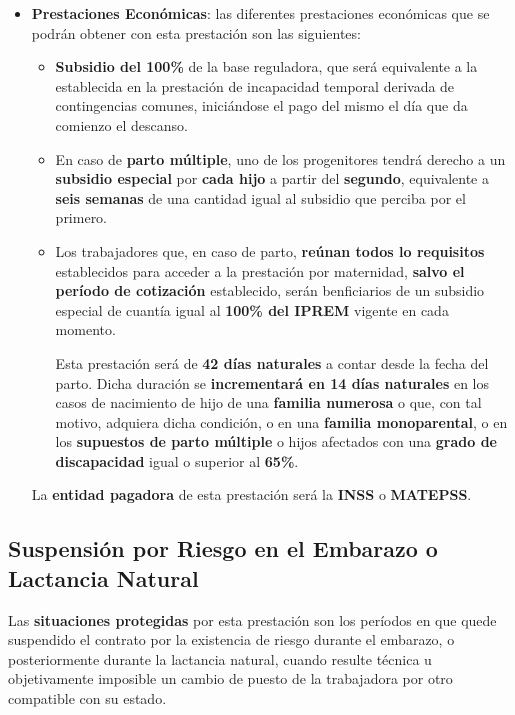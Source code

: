 \begin{itemize}
    \item \textbf{Prestaciones Económicas}: las diferentes prestaciones económicas que se podrán obtener con esta prestación son las siguientes:

    \begin{itemize}
        \item \textbf{Subsidio del 100\%}  de la base reguladora, que será equivalente a la establecida en la prestación de incapacidad temporal derivada de contingencias comunes, iniciándose el pago del mismo el día que da comienzo el descanso.
        \item En caso de \textbf{parto múltiple}, uno de los progenitores tendrá derecho  a un \textbf{subsidio especial} por \textbf{cada hijo} a partir del \textbf{segundo}, equivalente a \textbf{seis semanas} de una cantidad igual al subsidio que perciba por el primero.
        \item Los trabajadores que, en caso de parto, \textbf{reúnan todos lo requisitos} establecidos para acceder a la prestación por maternidad, \textbf{salvo el período de cotización} establecido, serán benficiarios de un subsidio especial de cuantía igual al \textbf{100\% del IPREM} vigente en cada momento.

        Esta prestación será de \textbf{42 días naturales} a contar desde la fecha del parto. Dicha duración se \textbf{incrementará en 14 días naturales} en los casos de nacimiento de hijo de una \textbf{familia numerosa} o que, con tal motivo, adquiera dicha condición, o en una \textbf{familia monoparental}, o en los \textbf{supuestos de parto múltiple} o hijos afectados con una \textbf{grado de discapacidad} igual o superior al \textbf{65\%}.
    \end{itemize}

    La \textbf{entidad pagadora} de esta prestación será la \textbf{INSS} o \textbf{MATEPSS}.
\end{itemize}

\subsection{Suspensión por Riesgo en el Embarazo o Lactancia Natural}
Las \textbf{situaciones protegidas} por esta prestación son los períodos en que quede suspendido el contrato por la existencia de riesgo durante el embarazo, o posteriormente durante la lactancia natural, cuando resulte técnica u objetivamente imposible un cambio de puesto de la trabajadora por otro compatible con su estado.

